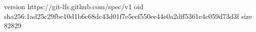 version https://git-lfs.github.com/spec/v1
oid sha256:1ad25c29fbe10d1b6c68dc43d01f7e5eef550ee44e0a2dff5361e4c059d73d3f
size 82829
